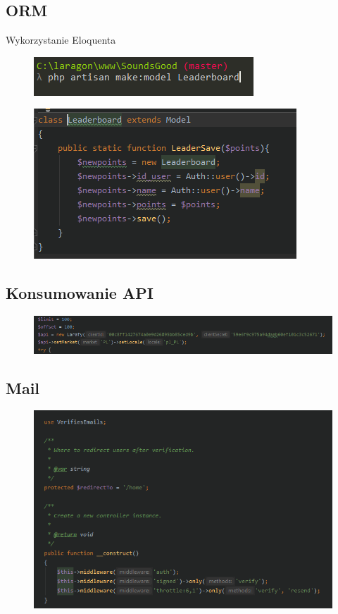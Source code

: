 \documentclass[11pt,a4paper]{article}
\begin{document}
\subsection{\textbf{ORM}}
Wykorzystanie Eloquenta
\begin{figure} [h]
\centering
\includegraphics [keepaspectratio] {1.8.1.png}
\end{figure}
\begin{figure} [h]
\centering
\includegraphics [keepaspectratio] {1.8.png}
\end{figure}
\subsection{\textbf{Konsumowanie API}}
\begin{figure} [h]
\centering
\includegraphics [keepaspectratio, scale=0.8] {1.9.png}
\end{figure}
\newpage
\subsection{\textbf{Mail}}
\begin{figure} [h]
\centering
\includegraphics [keepaspectratio] {1.10.png}
\end{figure}
\newpage
\end{document}
